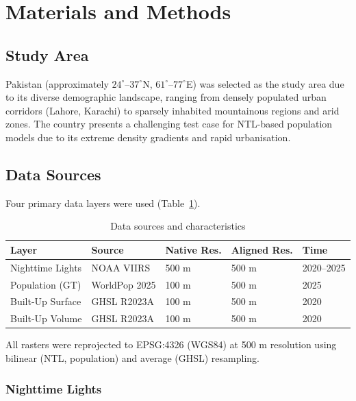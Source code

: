 \documentclass[conference]{IEEEtran}
\begin{document}
\section{Materials and Methods}
\label{sec:methods}

\subsection{Study Area}
\label{subsec:studyarea}

Pakistan (approximately $24^{\circ}$--$37^{\circ}$N, $61^{\circ}$--$77^{\circ}$E) was selected as the study area due to its diverse demographic landscape, ranging from densely populated urban corridors (Lahore, Karachi) to sparsely inhabited mountainous regions and arid zones. The country presents a challenging test case for NTL-based population models due to its extreme density gradients and rapid urbanisation.

\subsection{Data Sources}
\label{subsec:data}

Four primary data layers were used (Table~\ref{tab:data}).

\begin{table}[htbp]
\caption{Data sources and characteristics}
\label{tab:data}
\centering
\begin{tabular}{@{}lllll@{}}
\toprule
\textbf{Layer} & \textbf{Source} & \textbf{Native Res.} & \textbf{Aligned Res.} & \textbf{Time} \\
\midrule
Nighttime Lights & NOAA VIIRS & 500 m & 500 m & 2020--2025 \\
Population (GT) & WorldPop 2025 & 100 m & 500 m & 2025 \\
Built-Up Surface & GHSL R2023A & 100 m & 500 m & 2020 \\
Built-Up Volume & GHSL R2023A & 100 m & 500 m & 2020 \\
\bottomrule
\end{tabular}
\end{table}

All rasters were reprojected to EPSG:4326 (WGS84) at 500 m resolution using bilinear (NTL, population) and average (GHSL) resampling.

\subsubsection{Nighttime Lights}
\end{document}
